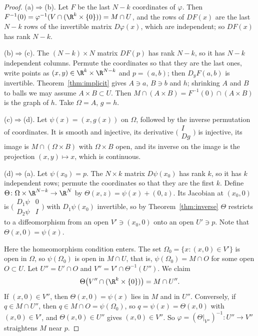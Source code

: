 \begin{proof}
(a)$\Rightarrow$(b). Let $F$ be the last $N-k$ coordinates of $\varphi$. Then $F^{-1}(0)=\varphi^{-1}(V\cap(\R^k\times\{0\}))=M\cap U$, and the rows of
$DF(x)$ are the last $N-k$ rows of the invertible matrix $D\varphi(x)$, which are independent; so $DF(x)$ has rank $N-k$.

(b)$\Rightarrow$(c). The $(N-k)\times N$ matrix $DF(p)$ has rank $N-k$, so it has $N-k$ independent columns. Permute the coordinates so that they are the
last ones, write points as $(x,y)\in\R^k\times\R^{N-k}$ and $p=(a,b)$; then $D_yF(a,b)$ is invertible. Theorem~\ref{thm:implicit} gives $A\ni a$, $B\ni b$
and $h$; shrinking $A$ and $B$ to balls we may assume $A\times B\subset U$. Then $M\cap(A\times B)=F^{-1}(0)\cap(A\times B)$ is the graph of $h$. Take
$\Omega=A$, $g=h$.

(c)$\Rightarrow$(d). Let $\psi(x)=(x,g(x))$ on $\Omega$, followed by the inverse permutation of coordinates. It is smooth and injective, its derivative
$\bigl(\begin{smallmatrix}I\\ Dg\end{smallmatrix}\bigr)$ is injective, its image is $M\cap(\Omega\times B)$ with $\Omega\times B$ open, and its inverse on
the image is the projection $(x,y)\mapsto x$, which is continuous.

(d)$\Rightarrow$(a). Let $\psi(x_0)=p$. The $N\times k$ matrix $D\psi(x_0)$ has rank $k$, so it has $k$ independent rows; permute the coordinates so that
they are the first $k$. Define $\Theta\colon\Omega\times\R^{N-k}\to\R^N$ by $\Theta(x,z)=\psi(x)+(0,z)$. Its Jacobian at $(x_0,0)$ is
$\bigl(\begin{smallmatrix}D_1\psi&0\\ D_2\psi&I\end{smallmatrix}\bigr)$ with $D_1\psi(x_0)$ invertible, so by Theorem~\ref{thm:inverse} $\Theta$ restricts to a
diffeomorphism from an open $V'\ni(x_0,0)$ onto an open $U'\ni p$. Note that $\Theta(x,0)=\psi(x)$.

Here the homeomorphism condition enters. The set $\Omega_0=\{x:(x,0)\in V'\}$ is open in $\Omega$, so $\psi(\Omega_0)$ is open in $M\cap U$, that is,
$\psi(\Omega_0)=M\cap O$ for some open $O\subset U$. Let $U''=U'\cap O$ and $V''=V'\cap\Theta^{-1}(U'')$. We claim
\[
\Theta\bigl(V''\cap(\R^k\times\{0\})\bigr)=M\cap U''.
\]
If $(x,0)\in V''$, then $\Theta(x,0)=\psi(x)$ lies in $M$ and in $U''$. Conversely, if $q\in M\cap U''$, then $q\in M\cap O=\psi(\Omega_0)$, so $q=\psi(x)=\Theta(x,0)$
with $(x,0)\in V'$, and $\Theta(x,0)\in U''$ gives $(x,0)\in V''$. So $\varphi=(\Theta|_{V''})^{-1}\colon U''\to V''$ straightens $M$ near $p$.
\end{proof}

